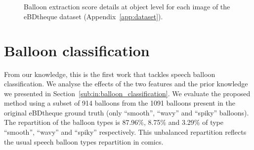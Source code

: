 \begin{figure}[!ht]
  \\
  \\

  \caption[Balloon extraction score details at object level for each image of the eBDtheque dataset]{Balloon extraction score details at object level for each image of the eBDtheque dataset (Appendix~\ref{app:dataset}).}
    \label{fig:ex:balloon_detection_result_details}
\end{figure}



\section{Balloon classification} %
\label{sub:ex:balloon_classification}
From our knowledge, this is the first work that tackles speech balloon classification.
We analyse the effects of the two features and the prior knowledge we presented in Section~\ref{sub:in:balloon_classification}.
We evaluate the proposed method using a subset of 914 balloons from the 1091 balloons present in the original eBDtheque ground truth (only ``smooth'', ``wavy'' and ``spiky'' balloons).
The repartition of the balloon types is 87.96\%, 8.75\% and 3.29\% of type ``smooth'', ``wavy'' and ``spiky'' respectively.
This unbalanced repartition reflects the usual speech balloon types repartition in comics.

